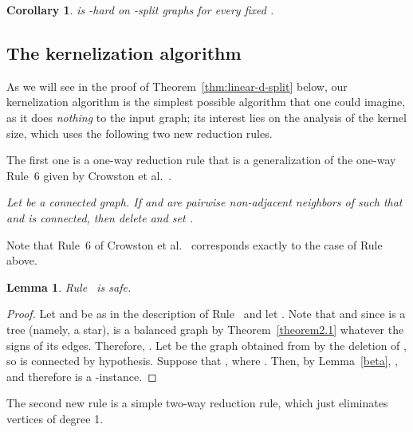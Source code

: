 \documentclass[
final
]{dmtcs-episciences}
\newtheorem{lemma}{Lemma}{\bfseries}{\itshape}
\newtheorem{corollary}{Corollary}{\bfseries}{\itshape}
\begin{document}
\begin{corollary}\label{cor:NP-hard}
{} is {}-hard on -split graphs for every fixed .				 
\end{corollary}











\subsection{The kernelization algorithm}
\label{subsec:linear-kernel}

As we will see in the proof of Theorem~\ref{thm:linear-d-split} below, our kernelization algorithm is the simplest possible algorithm that one could imagine, as it does {\sl nothing} to the input graph; its interest lies on the analysis of the kernel size,  which uses the following two new reduction rules.

The first one  is a one-way reduction rule that is a generalization of the one-way Rule~6 given by Crowston et al.~\cite{crowston2013maximum}.

\vspace{.3cm}

 {\it{Let  be a connected graph. If  and  are pairwise non-adjacent neighbors of  such that  and  is connected, then delete  and set .}}

\vspace{.3cm}

Note that Rule~6 of Crowston et al.~\cite{crowston2013maximum} corresponds exactly to the case  of Rule~ above. 



	
\begin{lemma}\label{lem:Rule6+-safe}\label{lem:6+-safe}
Rule~ is safe.		
\end{lemma}
		\begin{proof}
Let  and  be as in the description of Rule~ and let . Note that  and since  is a tree (namely, a star),  is a balanced graph by Theorem~\ref{theorem2.1} whatever the signs of its edges. Therefore, . Let  be the graph obtained from  by the deletion of , so  is connected by hypothesis.
Suppose that , where . Then, by Lemma~\ref{beta}, , and therefore  is a {}-instance. 		
		\end{proof}

The second new rule is a simple two-way reduction rule, which just eliminates vertices of degree 1.
\vspace{.25cm}
\end{document}
